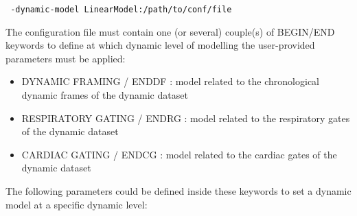 \documentclass[a4paper, 11pt]{article}
\begin{document}
\bigskip
\verb| -dynamic-model LinearModel:/path/to/conf/file|
\bigskip

The configuration file must contain one (or several) couple(s) of BEGIN/END keywords to define at which dynamic level of modelling the user-provided parameters must be applied:
\begin{itemize}
\item DYNAMIC FRAMING / ENDDF : model related to the chronological dynamic frames of the dynamic dataset
\item RESPIRATORY GATING / ENDRG : model related to the respiratory gates of the dynamic dataset
\item CARDIAC GATING / ENDCG : model related to the cardiac gates of the dynamic dataset
\end{itemize}


The following parameters could be defined inside these keywords to set a dynamic model at a specific dynamic level:
\end{document}
